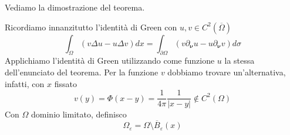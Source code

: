 \documentclass[10pt,a4paper,twoside,openright]{book}
\begin{document}
Vediamo la dimostrazione del teorema.
\begin{dimostrazione}
	Ricordiamo innanzitutto l'identità di Green con $\displaystyle u,v\in C^{2}(\overline{\Omega })$
	\begin{equation*}
		\int _{\Omega }( v\Delta u-u\Delta v) dx=\int _{\partial \Omega }( v\partial _{\bm{\nu}} u-u\partial _{\bm{\nu}} v) d\sigma 
	\end{equation*}
	Applichiamo l'identità di Green utilizzando come funzione $\displaystyle u$ la stessa dell'enunciato del teorema. Per la funzione $\displaystyle v$ dobbiamo trovare un'alternativa, infatti, con $\displaystyle x$ fissato
	\begin{equation*}
		v(y) =\Phi (x-y) =\frac{1}{4\pi }\frac{1}{| x-y| } \notin C^{2}(\Omega)
	\end{equation*}
	Con $\displaystyle \Omega $ dominio limitato, definisco 
	\begin{equation*}
		\Omega _{\varepsilon } =\Omega \setminus \overline{B}_{\varepsilon }(x)
	\end{equation*}
	
	\begin{figure}[H]
		\centering

		\begin{tikzpicture}[x=0.75pt,y=0.75pt,yscale=-1,xscale=1]


\end{tikzpicture}
\end{figure}
\end{dimostrazione}
\end{document}
